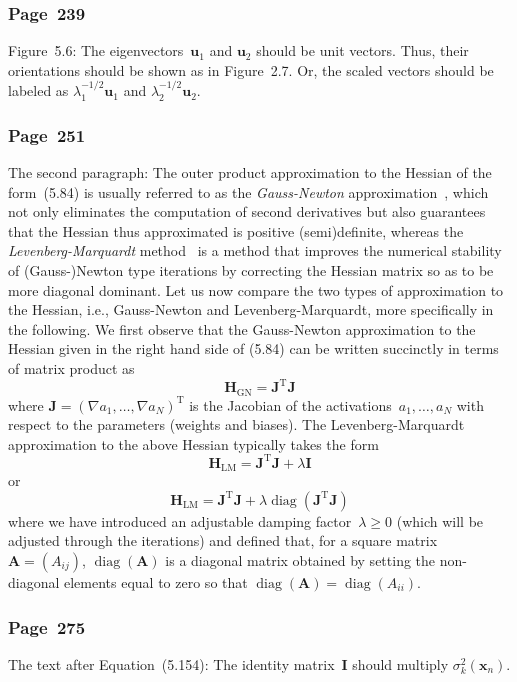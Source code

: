 \documentclass[12pt,a4paper]{article}
\newcommand{\erratum}[1]{\subsubsection*{#1}}
\begin{document}
\erratum{Page~239}
Figure~5.6:
The eigenvectors~$\mathbf{u}_{1}$ and $\mathbf{u}_{2}$ should be unit vectors.
Thus, their orientations should be shown as in Figure~2.7.
Or, the scaled vectors should be labeled as
$\lambda_{1}^{-1/2}\mathbf{u}_{1}$ and $\lambda_{2}^{-1/2}\mathbf{u}_{2}$.

\erratum{Page~251}
The second paragraph:
The outer product approximation to the Hessian of the form~(5.84) is usually referred to as
the \emph{Gauss-Newton} approximation~\citep{Press:NR},
which not only eliminates the computation of second derivatives
but also guarantees that the Hessian thus approximated is positive (semi)definite,
whereas the \emph{Levenberg-Marquardt} method~\citep{Press:NR} is a method that improves
the numerical stability of (Gauss\nobreakdash-)Newton type iterations
by correcting the Hessian matrix so as to be more diagonal dominant.
Let us now compare the two types of approximation to the Hessian, i.e.,
Gauss-Newton and Levenberg-Marquardt, more specifically in the following.
We first observe that the Gauss-Newton approximation to the Hessian
given in the right hand side of (5.84)
can be written succinctly in terms of matrix product as
\begin{equation}
\mathbf{H}_{\text{GN}} = \mathbf{J}^{\operatorname{T}}\mathbf{J}
\end{equation}
where $\mathbf{J} = \left( \nabla a_1, \dots, \nabla a_N \right)^{\operatorname{T}}$ is
the Jacobian of the activations~$a_1, \dots, a_N$ with respect to the parameters
(weights and biases).
The Levenberg-Marquardt approximation to the above Hessian typically takes the form
\begin{equation}
\mathbf{H}_{\text{LM}} = \mathbf{J}^{\operatorname{T}}\mathbf{J} + \lambda \mathbf{I}
\end{equation}
or
\begin{equation}
\mathbf{H}_{\text{LM}} = \mathbf{J}^{\operatorname{T}}\mathbf{J}
+ \lambda \operatorname{diag}\left( \mathbf{J}^{\operatorname{T}}\mathbf{J} \right)
\end{equation}
where we have introduced an adjustable damping factor~$\lambda \geqslant 0$
(which will be adjusted through the iterations) and defined that,
for a square matrix~$\mathbf{A} = (A_{ij})$, $\operatorname{diag}(\mathbf{A})$ is
a diagonal matrix obtained by setting the non-diagonal elements equal to zero so that
$\operatorname{diag}(\mathbf{A}) = \operatorname{diag}(A_{ii})$.

\erratum{Page~275}
The text after Equation~(5.154):
The identity matrix~$\mathbf{I}$ should multiply $\sigma_{k}^{2}(\mathbf{x}_{n})$.
\end{document}
